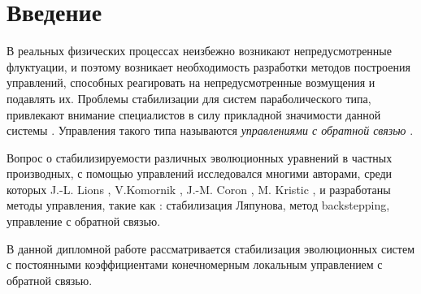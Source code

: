 \section*{Введение}
\vspace{1em}

В реальных физических процессах неизбежно возникают непредусмотренные 
флуктуации, и поэтому возникает необходимость разработки методов построения 
управлений, способных реагировать на непредусмотренные возмущения и подавлять 
их. Проблемы стабилизации для систем параболического типа, привлекают внимание 
специалистов в силу прикладной значимости данной системы \cite{Chebotarev}. Управления такого 
типа называются \emph{управлениями с обратной связью} \cite{KS}.

Вопрос о стабилизируемости различных эволюционных уравнений в частных 
производных, с помощью управлений исследовался многими авторами, среди которых 
J.-L. Lions \cite{}, V.Komornik \cite{}, J.-M. Coron \cite{}, M. Kristic
\cite{KMV, KS}, и разработаны методы 
управления, такие как : стабилизация Ляпунова, метод backstepping, управление 
с обратной связью.

В данной дипломной работе рассматривается стабилизация эволюционных систем с 
постоянными коэффициентами конечномерным локальным управлением с обратной связью.
